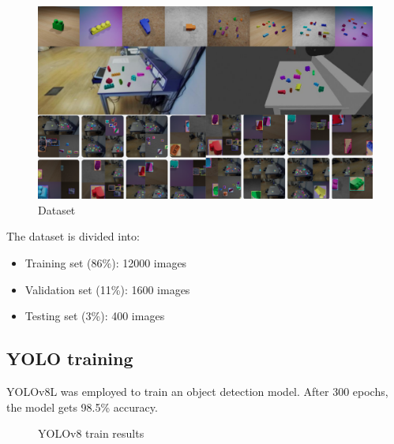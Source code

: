 \documentclass{article}
\begin{document}
	\begin{figure}[H]
		\centering
		\includegraphics[width=1.0\textwidth]{images/dataset.png}
		\caption{Dataset}
		\label{fig:dataset}
	\end{figure}
	
	The dataset is divided into:
	\begin{itemize}
		\item Training set (86\%): 12000 images
		\item Validation set (11\%): 1600 images
		\item Testing set (3\%): 400 images
	\end{itemize}
	
	\subsection{YOLO training}
	YOLOv8L was employed to train an object detection model. After 300 epochs, the model gets 98.5\% accuracy.
	
	\begin{figure}[H]
		\centering
		\caption{YOLOv8 train results}
		\label{fig:train_results}
	\end{figure}
	
\end{document}
